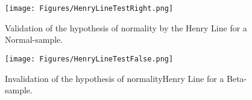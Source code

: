              \begin{figure}[H]
               \begin{minipage}{10cm}
                 \begin{center}
                   \texttt{[image: Figures/HenryLineTestRight.png]}
                   \caption{Validation of the hypothesis of normality by the Henry Line for a Normal-sample.}
                   \label{henryLineExRight}
                 \end{center}
               \end{minipage}
               \hfill
               \begin{minipage}{10cm}
                 \begin{center}
                   \texttt{[image: Figures/HenryLineTestFalse.png]}
                   \caption{Invalidation of the hypothesis of normalityHenry Line for a Beta-sample.}
                   \label{henryLineExFalse}
                 \end{center}
               \end{minipage}
             \end{figure}

